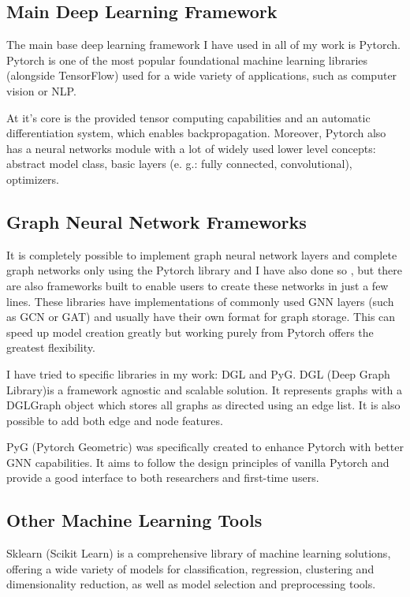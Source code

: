 	\subsection{Main Deep Learning Framework}
	
	The main base deep learning framework I have used in all of my work is Pytorch. Pytorch is one of the most popular foundational machine learning libraries (alongside TensorFlow) used for a wide variety of applications, such as computer vision or NLP. 
	
	At it's core is the provided tensor computing capabilities and an automatic differentiation system, which enables backpropagation. Moreover, Pytorch also has a neural networks module with a lot of widely used lower level concepts: abstract model class, basic layers (e. g.: fully connected, convolutional), optimizers.
	
	\subsection{Graph Neural Network Frameworks}
	
	It is completely possible to implement graph neural network layers and complete graph networks only using the Pytorch library and I have also done so %
	, but there are also frameworks built to enable users to create these networks in just a few lines. These libraries have implementations of commonly used GNN layers (such as GCN or GAT) and usually have their own format for graph storage. This can speed up model creation greatly but working purely from Pytorch offers the greatest flexibility.
	
	I have tried to specific libraries in my work: DGL and PyG. DGL (Deep Graph Library)is a framework agnostic and scalable solution. It represents graphs with a DGLGraph object which stores all graphs as directed using an edge list. It is also possible to add both edge and node features.
	
	PyG (Pytorch Geometric) was specifically created to enhance Pytorch with better GNN capabilities. It aims to follow the design principles of vanilla Pytorch and provide a good interface to both researchers and first-time users.  
	
	\subsection{Other Machine Learning Tools}
	
	Sklearn (Scikit Learn) is a comprehensive library of machine learning solutions, offering a wide variety of models for classification, regression, clustering and dimensionality reduction, as well as model selection and preprocessing tools.
	
